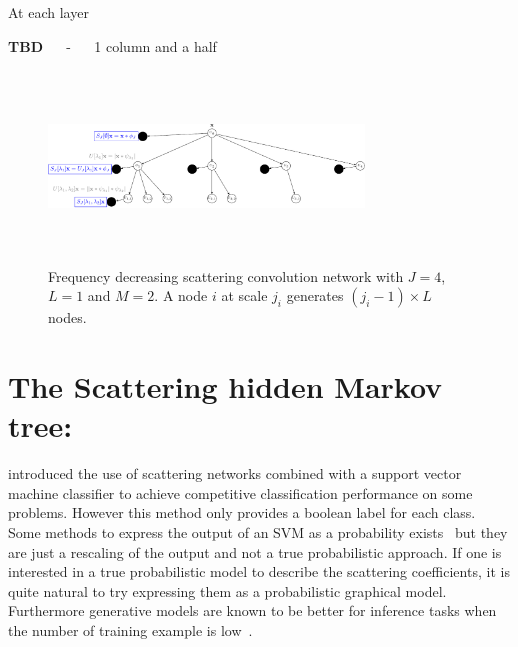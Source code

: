 \documentclass{article}
\begin{document}
	At each layer 
	
	
  \textbf{TBD} $\quad$ - $\quad$ 1 column and a half

  \begin{figure}[h]
    \begin{center}
      \includegraphics[width=3.3in, height=2in, keepaspectratio]{ST_freqDec_crop.pdf}
      \caption[Frequency decreasing scattering convolution network.]{\centering  Frequency decreasing scattering convolution network 	with $J=4$, $L=1$ and $M=2$. A node $i$ at scale $j_{i}$ generates $(j_{i}-1) \times L$ nodes. }
      \label{fig:SCN 2}
    \end{center}	
  \end{figure}



\section{The Scattering hidden Markov tree:}
\label{sec:SCHMT}

  \cite{Mallat ST} introduced the use of scattering networks combined with a support vector machine classifier to achieve competitive classification performance on some problems. However this method only provides a boolean label for each class. Some methods to express the output of an SVM as a probability exists~\cite{platt1999probabilistic} but they are just a rescaling of the output and not a true probabilistic approach. If one is interested in a true probabilistic model to describe the scattering coefficients, it is quite natural to try expressing them as a probabilistic graphical model. Furthermore generative models are known to be better for inference tasks when the number of training example is low~\cite{jordan2002discriminative}.\\
  
\end{document}
